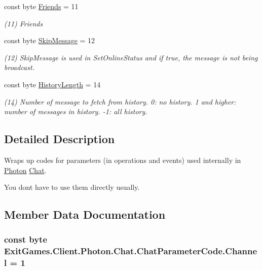 \begin{DoxyCompactItemize}
const byte \hyperlink{class_exit_games_1_1_client_1_1_photon_1_1_chat_1_1_chat_parameter_code_add457c04174a03d5ba481dce96f4e8b9}{Friends} = 11
\begin{DoxyCompactList}\small\item\em (11) Friends\end{DoxyCompactList}\item 
const byte \hyperlink{class_exit_games_1_1_client_1_1_photon_1_1_chat_1_1_chat_parameter_code_ac71ce98ee09da1f9b010b11e8d6f73aa}{Skip\+Message} = 12
\begin{DoxyCompactList}\small\item\em (12) Skip\+Message is used in Set\+Online\+Status and if true, the message is not being broadcast.\end{DoxyCompactList}\item 
const byte \hyperlink{class_exit_games_1_1_client_1_1_photon_1_1_chat_1_1_chat_parameter_code_ad3428d51c4eac42c0de3aa6d5819ecd3}{History\+Length} = 14
\begin{DoxyCompactList}\small\item\em (14) Number of message to fetch from history. 0\+: no history. 1 and higher\+: number of messages in history. -\/1\+: all history.\end{DoxyCompactList}\end{DoxyCompactItemize}


\subsection{Detailed Description}
Wraps up codes for parameters (in operations and events) used internally in \hyperlink{namespace_exit_games_1_1_client_1_1_photon}{Photon} \hyperlink{namespace_exit_games_1_1_client_1_1_photon_1_1_chat}{Chat}. 

You don\textquotesingle{}t have to use them directly usually. 

\subsection{Member Data Documentation}
\subsubsection[{\texorpdfstring{Channel}{Channel}}]{\setlength{\rightskip}{0pt plus 5cm}const byte Exit\+Games.\+Client.\+Photon.\+Chat.\+Chat\+Parameter\+Code.\+Channel = 1}\hypertarget{class_exit_games_1_1_client_1_1_photon_1_1_chat_1_1_chat_parameter_code_a556f1d5a6cc2e8fb7dfb4f80fa39311b}{}\label{class_exit_games_1_1_client_1_1_photon_1_1_chat_1_1_chat_parameter_code_a556f1d5a6cc2e8fb7dfb4f80fa39311b}


